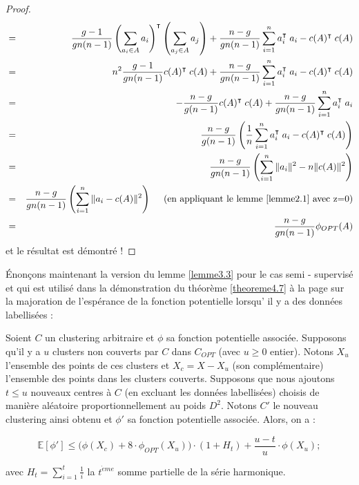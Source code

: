 \documentclass[12pt,a4paper]{book}
\newcommand{\E}{\mathbb{E}}
\newcommand{\1}{\mathds{1}}
\begin{document}
\begin{proof}
\begin{eqnarray*}
			&=& \frac{g-1}{gn(n-1)} \left( \sum_{a_i \in A} a_i \right)^\intercal \left( \sum_{a_j \in A} a_j \right) + \frac{n-g}{gn(n-1)} \sum_{i=1}^n a_i^\intercal \; a_i - c(A)^\intercal \; c(A) \\
			&=& n^2 \frac{g-1}{gn(n-1)} c(A)^\intercal \; c(A) + \frac{n-g}{gn(n-1)} \sum_{i=1}^n a_i^\intercal \; a_i - c(A)^\intercal \; c(A) \\
			&=& - \frac{n-g}{g(n-1)} c(A)^\intercal \; c(A) + \frac{n-g}{gn(n-1)} \sum_{i=1}^n a_i^\intercal \; a_i \\
			&=& \frac{n-g}{g(n-1)} \left( \frac{1}{n} \sum_{i=1}^n a_i^\intercal \; a_i - c(A)^\intercal \; c(A) \right)\\
			&=& \frac{n-g}{gn(n-1)} \left( \sum_{i=1}^n \Vert a_i \Vert^2 - n \Vert c(A) \Vert^2 \right) \\
			&=& \frac{n-g}{gn(n-1)} \left( \sum_{i=1}^n \Vert a_i - c(A) \Vert^2 \right) \quad \textrm{ (en appliquant le lemme \ref{lemme2.1} avec z=0)}\\
			&=& \frac{n-g}{gn(n-1)} \phi_{OPT}(A)
		\end{eqnarray*}
		et le résultat est démontré !
		
	\end{proof}	
	
	
	Énonçons maintenant la version du lemme \ref{lemme3.3} pour le cas semi - supervisé et qui est utilisé dans la démonstration du théorème \ref{theoreme4.7} à la page \pageref{theoreme4.7} sur la majoration de l'espérance de la fonction potentielle lorsqu' il y a des données labellisées :
	
	\begin{env_lemme}\label{lemme4.6}
		Soient $C$ un clustering arbitraire  et $\phi$ sa fonction potentielle associée.
		Supposons qu'il y a $u$ clusters  non couverts par $C$ dans $C_{OPT}$ (avec $u \geq 0$ entier). Notons $X_u$ l'ensemble des points de ces clusters et $X_c=X-X_u$ (son complémentaire) l'ensemble des points dans les clusters couverts. Supposons que nous ajoutons $t \leq u$ nouveaux centres à $C$ (en excluant les données labellisées) choisis de manière aléatoire proportionnellement au poids $D^2$. Notons $C'$ le nouveau clustering ainsi obtenu et $\phi'$ sa fonction potentielle associée. Alors, on a :
		
		$$
			\E\left[\phi'\right] \leq \bigg( \phi \left( X_c \right) + 8 \cdot \phi_{OPT} \left( X_u \right) \bigg) \cdot \left( 1 + H_t \right) + \frac{u-t}{u} \cdot \phi \left( X_u \right) ;
		$$
		
		avec $H_t = \displaystyle \sum_{i=1}^{t} \frac{1}{i}$ la $t^{\grave{e}me}$ somme partielle de la série harmonique.
	\end{env_lemme}	
	
\end{document}
